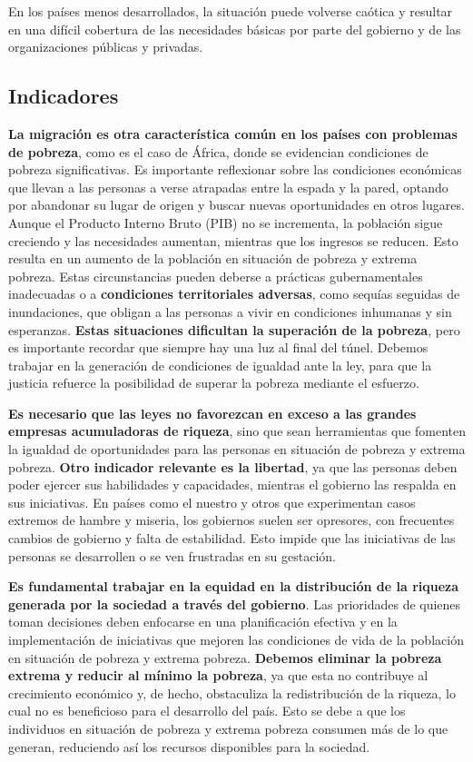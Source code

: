 \documentclass[
  a4paper,
]{article}
\begin{document}
En los países menos desarrollados, la situación puede volverse caótica y
resultar en una difícil cobertura de las necesidades básicas por parte
del gobierno y de las organizaciones públicas y privadas.

\subsection{Indicadores}\label{indicadores}

\textbf{La migración es otra característica común en los países con
problemas de pobreza}, como es el caso de África, donde se evidencian
condiciones de pobreza significativas. Es importante reflexionar sobre
las condiciones económicas que llevan a las personas a verse atrapadas
entre la espada y la pared, optando por abandonar su lugar de origen y
buscar nuevas oportunidades en otros lugares. Aunque el Producto Interno
Bruto (PIB) no se incrementa, la población sigue creciendo y las
necesidades aumentan, mientras que los ingresos se reducen. Esto resulta
en un aumento de la población en situación de pobreza y extrema pobreza.
Estas circunstancias pueden deberse a prácticas gubernamentales
inadecuadas o a \textbf{condiciones territoriales adversas}, como
sequías seguidas de inundaciones, que obligan a las personas a vivir en
condiciones inhumanas y sin esperanzas. \textbf{Estas situaciones
dificultan la superación de la pobreza}, pero es importante recordar que
siempre hay una luz al final del túnel. Debemos trabajar en la
generación de condiciones de igualdad ante la ley, para que la justicia
refuerce la posibilidad de superar la pobreza mediante el esfuerzo.

\textbf{Es necesario que las leyes no favorezcan en exceso a las grandes
empresas acumuladoras de riqueza}, sino que sean herramientas que
fomenten la igualdad de oportunidades para las personas en situación de
pobreza y extrema pobreza. \textbf{Otro indicador relevante es la
libertad}, ya que las personas deben poder ejercer sus habilidades y
capacidades, mientras el gobierno las respalda en sus iniciativas. En
países como el nuestro y otros que experimentan casos extremos de hambre
y miseria, los gobiernos suelen ser opresores, con frecuentes cambios de
gobierno y falta de estabilidad. Esto impide que las iniciativas de las
personas se desarrollen o se ven frustradas en su gestación.

\textbf{Es fundamental trabajar en la equidad en la distribución de la
riqueza generada por la sociedad a través del gobierno}. Las prioridades
de quienes toman decisiones deben enfocarse en una planificación
efectiva y en la implementación de iniciativas que mejoren las
condiciones de vida de la población en situación de pobreza y extrema
pobreza. \textbf{Debemos eliminar la pobreza extrema y reducir al mínimo
la pobreza}, ya que esta no contribuye al crecimiento económico y, de
hecho, obstaculiza la redistribución de la riqueza, lo cual no es
beneficioso para el desarrollo del país. Esto se debe a que los
individuos en situación de pobreza y extrema pobreza consumen más de lo
que generan, reduciendo así los recursos disponibles para la sociedad.
\end{document}
